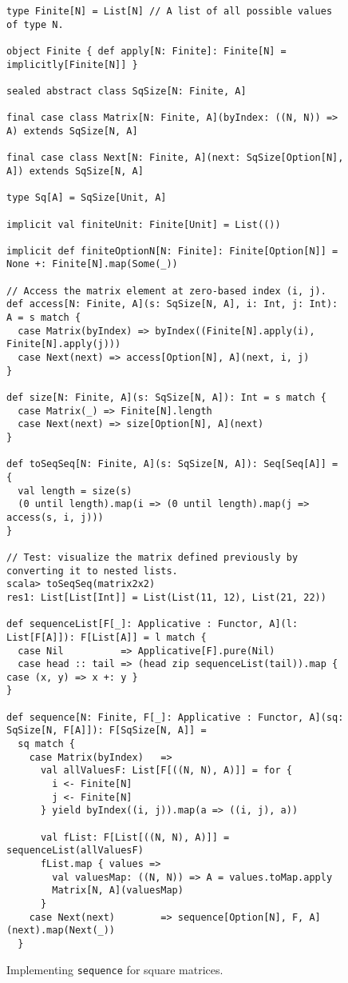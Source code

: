 \begin{figure}
\begin{centering}
\begin{lstlisting}[frame=single,fillcolor={\color{black}},framesep={0.2mm},framexleftmargin=2mm,framexrightmargin=2mm,framextopmargin=2mm,framexbottommargin=2mm]
type Finite[N] = List[N] // A list of all possible values of type N.

object Finite { def apply[N: Finite]: Finite[N] = implicitly[Finite[N]] }

sealed abstract class SqSize[N: Finite, A]

final case class Matrix[N: Finite, A](byIndex: ((N, N)) => A) extends SqSize[N, A]

final case class Next[N: Finite, A](next: SqSize[Option[N], A]) extends SqSize[N, A]

type Sq[A] = SqSize[Unit, A]

implicit val finiteUnit: Finite[Unit] = List(())

implicit def finiteOptionN[N: Finite]: Finite[Option[N]] = None +: Finite[N].map(Some(_))

// Access the matrix element at zero-based index (i, j).
def access[N: Finite, A](s: SqSize[N, A], i: Int, j: Int): A = s match {
  case Matrix(byIndex) => byIndex((Finite[N].apply(i), Finite[N].apply(j)))
  case Next(next) => access[Option[N], A](next, i, j)
}

def size[N: Finite, A](s: SqSize[N, A]): Int = s match {      
  case Matrix(_) => Finite[N].length
  case Next(next) => size[Option[N], A](next)
}

def toSeqSeq[N: Finite, A](s: SqSize[N, A]): Seq[Seq[A]] = {
  val length = size(s)
  (0 until length).map(i => (0 until length).map(j => access(s, i, j)))
} 

// Test: visualize the matrix defined previously by converting it to nested lists.
scala> toSeqSeq(matrix2x2)
res1: List[List[Int]] = List(List(11, 12), List(21, 22))

def sequenceList[F[_]: Applicative : Functor, A](l: List[F[A]]): F[List[A]] = l match {
  case Nil          => Applicative[F].pure(Nil)
  case head :: tail => (head zip sequenceList(tail)).map { case (x, y) => x +: y }
}

def sequence[N: Finite, F[_]: Applicative : Functor, A](sq: SqSize[N, F[A]]): F[SqSize[N, A]] =
  sq match {
    case Matrix(byIndex)   =>
      val allValuesF: List[F[((N, N), A)]] = for {
        i <- Finite[N]
        j <- Finite[N]
      } yield byIndex((i, j)).map(a => ((i, j), a))

      val fList: F[List[((N, N), A)]] = sequenceList(allValuesF)
      fList.map { values =>
        val valuesMap: ((N, N)) => A = values.toMap.apply
        Matrix[N, A](valuesMap)
      }
    case Next(next)        => sequence[Option[N], F, A](next).map(Next(_))
  }
\end{lstlisting}
\par\end{centering}
\caption{Implementing \lstinline!sequence! for square matrices.\label{fig:Full-code-implementing-traverse-for-square-matrix}}
\end{figure}

